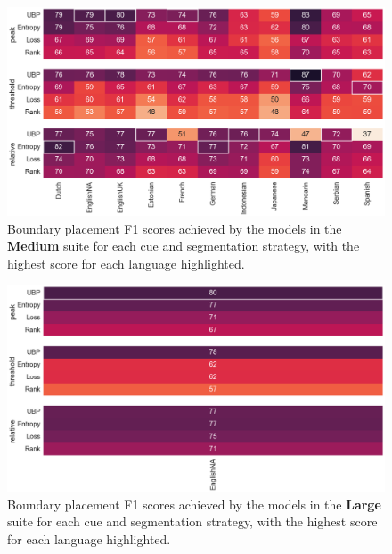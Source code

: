 \begin{figure}
    \centering
    \includegraphics[width=0.99\linewidth]{Figures/15Phonology/medium.png}
    \caption{Boundary placement F1 scores achieved by the models in the \textbf{Medium} suite for each cue and segmentation strategy, with the highest score for each language highlighted.}
    \label{fig:15-medium}
\end{figure}

\begin{figure}
    \centering
    \includegraphics[width=0.99\linewidth]{Figures/15Phonology/large.png}
    \caption{Boundary placement F1 scores achieved by the models in the \textbf{Large} suite for each cue and segmentation strategy, with the highest score for each language highlighted.}
    \label{fig:15-large}
\end{figure}


